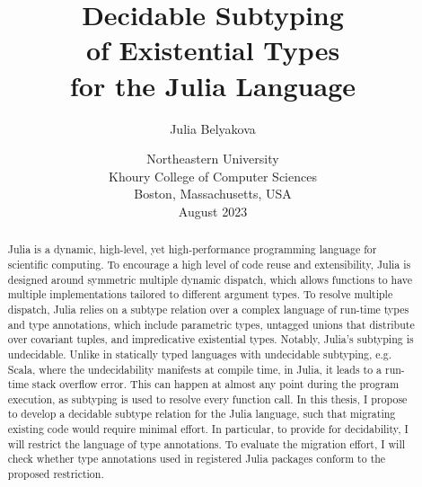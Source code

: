\title{Decidable Subtyping\\ of Existential Types\\for the Julia Language}

\author{Julia Belyakova}

\date{\normalsize%
Northeastern University\\
Khoury College of Computer Sciences\\
Boston, Massachusetts, USA\\
August 2023
}

\maketitle


\begin{abstract}

Julia is a dynamic, high-level, yet high-performance programming language
for scientific computing.
To encourage a high level of code reuse and extensibility, Julia is
designed around symmetric multiple dynamic dispatch, which allows functions
to have multiple implementations tailored to different argument types.
To resolve multiple dispatch, Julia relies on a subtype relation over a complex
language of run-time types and type annotations, which include parametric types,
untagged unions that distribute over covariant tuples, and impredicative
existential types.
Notably, Julia's subtyping is undecidable.
Unlike in statically typed languages
with undecidable subtyping, e.g. Scala, where the undecidability manifests at
compile time, in Julia, it leads to a run-time stack overflow error. 
This can happen
at almost any point during the program execution, as subtyping is used to
resolve every function call.
In this thesis, I propose to develop a decidable subtype relation
for the Julia language,
such that migrating existing code would require minimal effort.
In particular, to provide for decidability, I will restrict the language of type
annotations. To evaluate the migration effort, I will check whether
type annotations used in registered Julia packages conform to the proposed
restriction.

\end{abstract}
